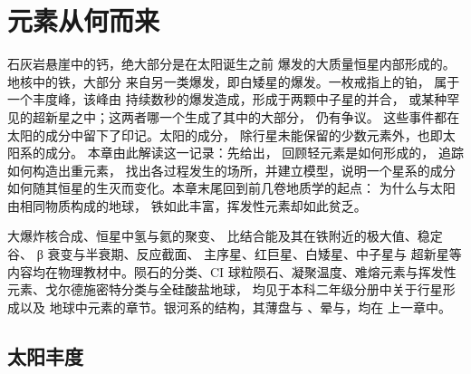 \chapter{元素从何而来}\label{ch:b3:origin-of-elements}

石灰岩悬崖中的钙，绝大部分是在太阳诞生之前
爆发的大质量恒星内部形成的。地核中的铁，大部分
来自另一类爆发，即白矮星的爆发。一枚戒指上的铂，
属于一个丰度峰，该峰由
持续数秒的爆发造成，形成于两颗中子星的并合，
或某种罕见的超新星之中；这两者哪一个生成了其中的大部分，
仍有争议。
这些事件都在太阳的成分中留下了印记。太阳的成分，
除行星未能保留的少数元素外，也即太阳系的成分。
本章由此解读这一记录：先给出，
回顾轻元素是如何形成的，
追踪如何构造出重元素，
找出各过程发生的场所，并建立模型，说明一个星系的成分
如何随其恒星的生灭而变化。本章末尾回到前几卷地质学的起点：
为什么与太阳由相同物质构成的地球，
铁如此丰富，挥发性元素却如此贫乏。

\begin{recall}
大爆炸核合成、恒星中氢与氦的聚变、
比结合能及其在铁附近的极大值、稳定谷、
β 衰变与半衰期、反应截面、
主序星、红巨星、白矮星、中子星与
超新星等内容均在物理教材中。陨石的分类、CI
球粒陨石、凝聚温度、难熔元素与挥发性
元素、戈尔德施密特分类与全硅酸盐地球，
均见于本科二年级分册中关于行星形成以及
地球中元素的章节。银河系的结构，其薄盘与
、晕与，均在
上一章中。
\end{recall}

\section{太阳丰度}\label{sec:b3:origin-of-elements:solar}

